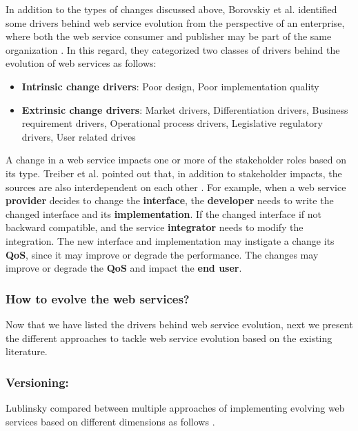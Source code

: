 \documentclass[runningheads,a4paper]{llncs}
\begin{document}
In addition to the types of changes discussed above, Borovskiy et al. identified some drivers behind web service evolution from the perspective of an enterprise, where both the web service consumer and publisher may be part of the same organization \cite{borovskiy2008evolution}. In this regard, they categorized two classes of drivers behind the evolution of web services as follows:

\begin{itemize}
  \item \textbf{Intrinsic change drivers}: Poor design, Poor implementation quality
  \item \textbf{Extrinsic change drivers}: Market drivers, Differentiation drivers, Business requirement drivers, Operational process drivers, Legislative regulatory drivers, User related drives
\end{itemize}


A change in a web service impacts one or more of the stakeholder roles based on its type. Treiber et al. pointed out that, in addition to stakeholder impacts, the sources are also interdependent on each other \cite{treiber2009analyzing}. For example, when a web service \textbf{provider} decides to change the \textbf{interface}, the \textbf{developer} needs to write the changed interface and its \textbf{implementation}. If the changed interface if not backward compatible, and the service \textbf{integrator} needs to modify the integration. The new interface and implementation may instigate a change its \textbf{QoS}, since it may improve or degrade the performance. The changes may improve or degrade the \textbf{QoS} and impact the \textbf{end user}.



\subsubsection{How to evolve the web services?} %
\label{sub:how_to_evolve_the_web_services_}
Now that we have listed the drivers behind web service evolution, next we present the different approaches to tackle web service evolution based on the existing literature.

\subsubsection{Versioning:} %
Lublinsky compared between multiple approaches of implementing evolving web services based on different dimensions as follows \cite{lublinsky2007versioning}.
\end{document}
